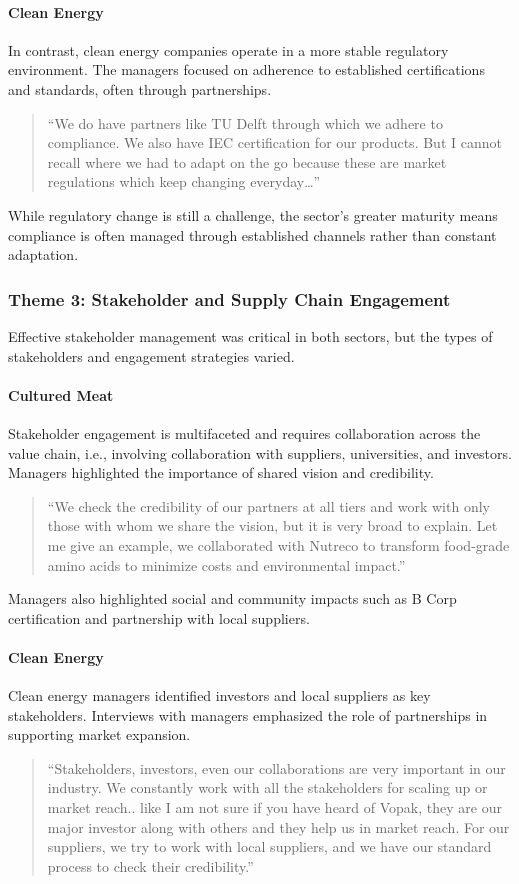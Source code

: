 \paragraph{Clean Energy}
In contrast, clean energy companies operate in a more stable regulatory environment. The managers focused on adherence to established certifications and standards, often through partnerships.
\begin{quote}
	“We do have partners like TU Delft through which we adhere to compliance. We also have IEC certification for our products. But I cannot recall where we had to adapt on the go because these are market regulations which keep changing everyday…”
\end{quote}
While regulatory change is still a challenge, the sector’s greater maturity means compliance is often managed through established channels rather than constant adaptation.

\subsubsection{Theme 3: Stakeholder and Supply Chain Engagement}
Effective stakeholder management was critical in both sectors, but the types of stakeholders and engagement strategies varied.

\paragraph{Cultured Meat}
Stakeholder engagement is multifaceted and requires collaboration across the value chain, i.e., involving collaboration with suppliers, universities, and investors. Managers highlighted the importance of shared vision and credibility.
\begin{quote}
	“We check the credibility of our partners at all tiers and work with only those with whom we share the vision, but it is very broad to explain. Let me give an example, we collaborated with Nutreco to transform food-grade amino acids to minimize costs and environmental impact.”
\end{quote}
Managers also highlighted social and community impacts such as B Corp certification and partnership with local suppliers.

\paragraph{Clean Energy}
Clean energy managers identified investors and local suppliers as key stakeholders. Interviews with managers emphasized the role of partnerships in supporting market expansion.
\begin{quote}
	“Stakeholders, investors, even our collaborations are very important in our industry. We constantly work with all the stakeholders for scaling up or market reach.. like I am not sure if you have heard of Vopak, they are our major investor along with others and they help us in market reach. For our suppliers, we try to work with local suppliers, and we have our standard process to check their credibility.”
\end{quote}

